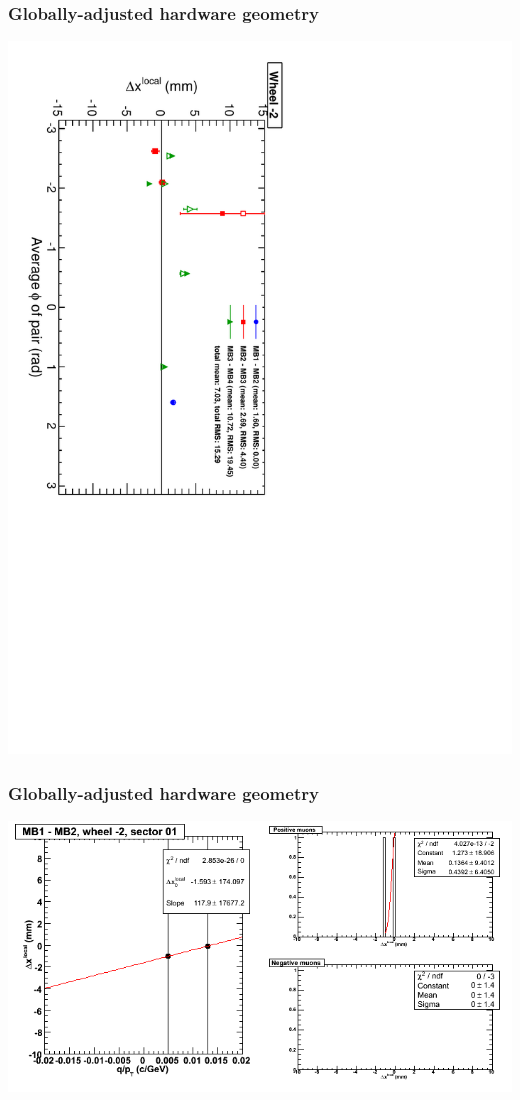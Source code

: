 \documentclass[compress]{beamer}
\begin{document}
\begin{frame}
\frametitle{Globally-adjusted hardware geometry}
\includegraphics[height=\linewidth, angle=90]{NOV4_segdiff_HW_x_whm2.pdf}
\end{frame}

\begin{frame}
\frametitle{Globally-adjusted hardware geometry}
\includegraphics[width=\linewidth]{NOV4_segdiffs_HW/dt13_resid_A_01_12.png}
\end{frame}
\end{document}
